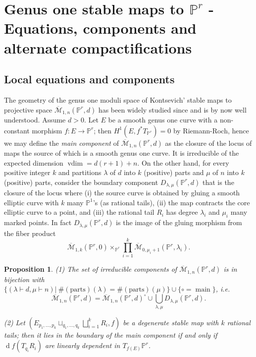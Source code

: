 \documentclass[11pt]{amsart}
\newcommand{\M}[4]{\overline{\mathcal M}_{#1,#2}(#3,#4)}
\newcommand{\PP}{\mathbb P}
\renewcommand{\to}{\rightarrow}
\theoremstyle{plain}
\newtheorem{prop}[thm]{Proposition}
\theoremstyle{definition}
\begin{document}
\section{Genus one stable maps to $\PP^r$ - Equations, components and alternate compactifications}

\subsection{Local equations and components}

The geometry of the genus one moduli space of Kontsevich' stable maps to projective space $\M{1}{n}{\PP^r}{d}$ has been widely studied since \cite{Vre} and is by now well understood. Assume $d>0$. Let $E$ be a smooth genus one curve with a non-constant morphism $f\colon E\to \PP^r$; then $H^1(E,f^*T_{\PP^r})=0$ by Riemann-Roch, hence we may define the \emph{main component} of $\M{1}{n}{\PP^r}{d}$ as the closure of the locus of maps the source of which is a smooth genus one curve. It is irreducible of the expected dimension $\operatorname{vdim}=d(r+1)+n$. On the other hand, for every positive integer $k$ and partitions $\lambda$ of $d$ into $k$ (positive) parts and $\mu$ of $n$ into $k$ (positive) parts, consider the boundary component $D_{\lambda,\mu}(\PP^r,d)$ that is the closure of the locus where (i) the source curve is obtained by gluing a smooth elliptic curve with $k$ many $\PP^1$'s (as rational tails), (ii) the map contracts the core elliptic curve to a point, and (iii) the rational tail $R_i$ has degree $\lambda_i$ and $\mu_i$ many marked points. In fact $D_{\lambda,\mu}(\PP^r,d)$ is the image of the gluing morphism from the fiber product
$$\M{1}{k}{\PP^r}{0}\times_{\PP^r}\prod_{i=1}^k\M{0}{\mu_i+1}{\PP^r}{\lambda_i}.$$

\begin{prop}\label{prop:components}
\emph{(1)} The set of irreducible components of $\M{1}{n}{\PP^r}{d}$ is in bijection with $\{(\lambda\vdash d,\mu\vdash n)|\ \#(\text{parts})(\lambda)=\#(\text{parts})(\mu)\}\cup\{\circ=\operatorname{main}\}$, i.e.
$$\M{1}{n}{\PP^r}{d}=\M{1}{n}{\PP^r}{d}^\circ\cup\bigcup_{\lambda,\mu}D_{\lambda,\mu}(\PP^r,d).$$

\emph{(2)} Let $(E {}_{p_1,\ldots,p_k}\sqcup_{q_1,\ldots,q_k}\bigsqcup_{i=1}^k R_i,f)$ be a degenerate stable map with $k$ rational tails; then it lies in the boundary of the main component if and only if $\operatorname{d}\!f(T_{q_i}R_i)$ are \emph{linearly dependent} in $T_{f(E)}\PP^r$.
\end{prop}
 
\end{document}
